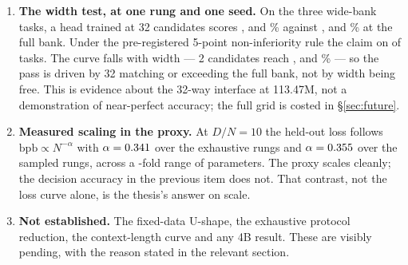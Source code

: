 \begin{enumerate}
  cells unmoved: capacity alone does not close the four cells the thesis needed. XNLI at 113.47M is a degenerate uniform predictor
  (\SuiteLargeXnliNll{} nats, one class on \SuiteLargeXnliTopShare\% of rows),
  not a weak attempt, and the \SuiteReplicationCells-cell replication puts the run-to-run floor at
  \SuiteReplicationMax{} points. DAIR Emotion's retired
  \SuiteSmallPriorEmotion\% and \SuiteMidPriorEmotion\% were a candidate-only
  scoring artifact; its dual-path values are valid measurements, but the change
  is not a capability gain.
  \item \textbf{The width test, at one rung and one seed.} On the three wide-bank
  tasks, a head trained at 32 candidates scores \EBankWThirtyTwo, \EClincWThirtyTwo{} and
  \EMassiveWThirtyTwo\% against \EBankWK, \EClincWK{} and \EMassiveWK\% at the full
  bank. Under the pre-registered 5-point non-inferiority rule the claim
  \EAggregateVerdict{} on \EHolds{} of \ETasks{} tasks. The curve falls with
  width --- 2 candidates reach \EBankWTwo, \EClincWTwo{} and \EMassiveWTwo\% --- so
  the pass is driven by 32 matching or exceeding the full bank, not by width
  being free.
  This is evidence about the 32-way interface at 113.47M, not a demonstration of
  near-perfect accuracy; the full grid is costed in \S\ref{sec:future}.
  \item \textbf{Measured scaling in the proxy.} At $D/N = 10$ the held-out loss
  follows $\mathrm{bpb} \propto N^{-\alpha}$ with $\alpha = 0.341$ over the
  \AlphaPoints{} exhaustive rungs and $\alpha = 0.355$ over the
  \AlphaPointsSampled{} sampled rungs, across a \IsoRange-fold range of
  parameters. The proxy scales cleanly; the decision accuracy in the previous
  item does not. That contrast, not the loss curve alone, is the thesis's answer
  on scale.
  \item \textbf{Not established.} The fixed-data U-shape, the exhaustive protocol
  reduction, the context-length curve and any 4B result. These are visibly
  pending, with the reason stated in the relevant section.

\end{enumerate}
